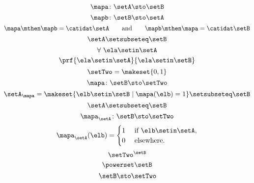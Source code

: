 \begin{forslides}
    \begin{equation}
        \label{eq:slides_session2_183}
        \mapa\colon \setA \sto \setB
    \end{equation}
    \begin{equation}
        \label{eq:slides_session2_184}
        \mapb \colon \setB \sto \setA
    \end{equation}
    \begin{equation}
        \label{eq:slides_session2_185}
        \mapa \mthen \mapb = \catidat\setA \qquad \text{and}  \qquad \mapb \mthen \mapa = \catidat\setB
    \end{equation}
    \begin{equation}
        \label{eq:slides_session2_186}
        \setA \setsubseteq \setB
    \end{equation}
    \begin{equation}
        \label{eq:slides_session2_187}
        \forall \ \ela \setin\setA
    \end{equation}
    \begin{equation}
        \label{eq:slides_session2_188}
        \prf{
            \ela \setin\setA
        }{
            \ela \setin\setB
        }
    \end{equation}
    \begin{equation}
        \label{eq:slides_session2_189}
        \setTwo = \makeset{ 0, 1}
    \end{equation}
    \begin{equation}
        \label{eq:slides_session2_190}
        \mapa \colon \setB \sto \setTwo
    \end{equation}
    \begin{equation}
        \label{eq:slides_session2_191}
        \setA_\mapa = \makeset{ \elb \setin\setB \mid \mapa(\elb) = 1 } \setsubseteq \setB
    \end{equation}
    \begin{equation}
        \label{eq:slides_session2_192}
        \setA \setsubseteq \setB
    \end{equation}
    \begin{equation}
        \label{eq:slides_session2_193}
        \mapa_\setA \colon \setB \sto \setTwo
    \end{equation}
    \begin{equation}
        \label{eq:slides_session2_194}
        \mapa_\setA(\elb) = \begin{cases}
            1 & \text{ if }\elb\setin\setA, \\
            0 & \text{ elsewhere}.
        \end{cases}
    \end{equation}
    \begin{equation}
        \label{eq:slides_session2_195}
        \setTwo^\setB
    \end{equation}
    \begin{equation}
        \label{eq:slides_session2_196}
        \powerset \setB
    \end{equation}
    \begin{equation}
        \label{eq:slides_session2_197}
        \setB \sto \setTwo
    \end{equation}


\end{forslides}
